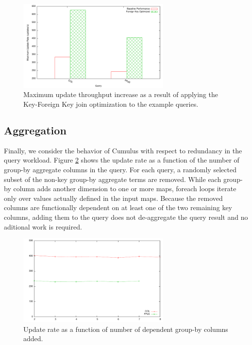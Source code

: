 \begin{figure}
\begin{center}
\includegraphics[width=3.0in]{images/foreignkey.pdf}
\caption{Maximum update throughput increase as a result of applying the Key-Foreign Key join optimization to the example queries.}
\label{fig:fkupdatethroughput}
\end{center}
\end{figure}

\subsection{Aggregation}
Finally, we consider the behavior of Cumulus with respect to redundancy in the query workload.  Figure \ref{fig:aggvsupdates} shows the update rate as a function of the number of group-by aggregate columns in the query.  For each query, a randomly selected subset of the non-key group-by aggregate terms are removed.  While each group-by column adds another dimension to one or more maps, foreach loops iterate only over values actually defined in the input maps.  Because the removed columns are functionally dependent on at least one of the two remaining key columns, adding them to the query does not de-aggregate the query result and no aditional work is required.

\begin{figure}
\begin{center}
\includegraphics[width=3.0in]{images/aggvsupdates.pdf}
\caption{Update rate as a function of number of dependent group-by columns added.}
\label{fig:aggvsupdates}
\end{center}
\end{figure}

